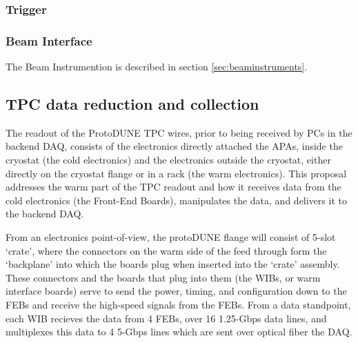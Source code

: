 \subsubsection{Trigger}


\subsubsection{Beam Interface}

The Beam Instrumention is described in section \ref{sec:beaminstruments}.

\subsection{TPC data reduction and collection}


The readout of the ProtoDUNE TPC wires, prior to being received by PCs in
the backend DAQ, consists of the electronics directly attached the APAs,
inside the cryostat (the cold electronics) and the electronics outside
the cryostat, either directly on the cryostat flange or in a rack (the
warm electronics).  This proposal addresses the warm part of the TPC
readout and how it receives data from the cold electronics (the Front-End
Boards), manipulates the data, and delivers it to the backend DAQ.

From an electronics point-of-view, the protoDUNE flange will consist of
5-slot ‘crate’, where the connectors on the warm side of the feed
through form the ‘backplane’ into which the boards plug when inserted
into the ‘crate’ assembly.  These connectors and the boards that plug
into them (the WIBs, or warm interface boards) serve to send the power,
timing, and configuration down to the FEBs and receive the high-speed
signals from the FEBs. From a data standpoint, each WIB recieves the
data from 4 FEBs, over 16 1.25-Gbps data lines, and multiplexes this
data to 4 5-Gbps lines which are sent over optical fiber the DAQ.

